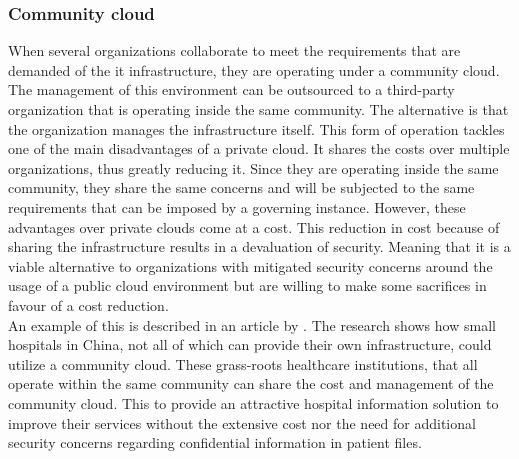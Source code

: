 \subsubsection{Community cloud}
When several organizations collaborate to meet the requirements that are demanded of the \acrshort{it} infrastructure, they are operating under a community cloud. 
The management of this environment can be outsourced to a third-party organization that is operating inside the same community. The alternative is that the organization manages the infrastructure itself.
This form of operation tackles one of the main disadvantages of a private cloud. It shares the costs over multiple organizations, thus greatly reducing it. 
Since they are operating inside the same community, they share the same concerns and will be subjected to the same requirements that can be imposed by a governing instance. 
However, these advantages over private clouds come at a cost. 
This reduction in cost because of sharing the infrastructure results in a devaluation of security. 
Meaning that it is a viable alternative to organizations with mitigated security concerns around the usage of a public cloud environment but are willing to make some sacrifices in favour of a cost reduction. 
\\
An example of this is described in an article by \textcite{Yao2014}. 
The research shows how small hospitals in China, not all of which can provide their own infrastructure, could utilize a community cloud. 
These grass-roots healthcare institutions, that all operate within the same community can share the cost and management of the community cloud. This to provide an attractive hospital information solution to improve their services without the extensive cost nor the need for additional security concerns regarding confidential information in patient files.

